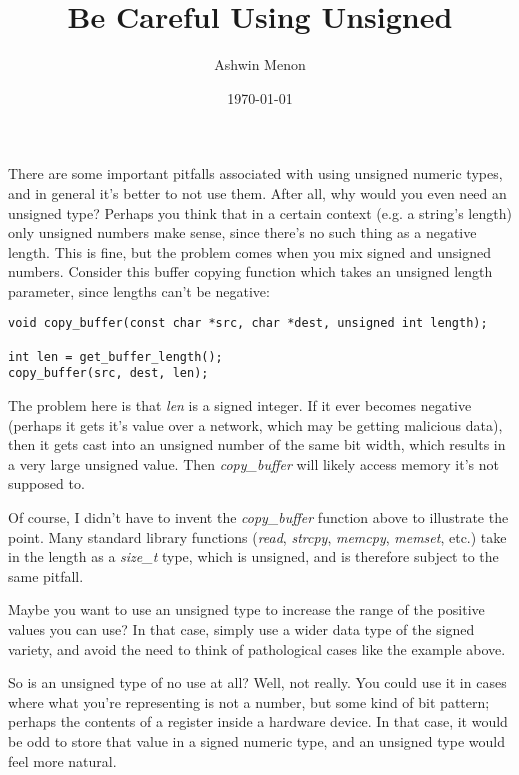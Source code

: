 \documentclass{article}
\begin{document}
\title{Be Careful Using Unsigned}
\author{Ashwin Menon}
\date{\today}
\maketitle

There are some important pitfalls associated with using unsigned numeric types, 
and in general it’s better to not use them. After all, why would you even need an 
unsigned type? Perhaps you think that in a certain context (e.g. a string’s length) 
only unsigned numbers make sense, since there’s no such thing as a negative length. 
This is fine, but the problem comes when you mix signed and unsigned numbers. 
Consider this buffer copying function which takes an unsigned length parameter, 
since lengths can’t be negative:

\begin{lstlisting}
void copy_buffer(const char *src, char *dest, unsigned int length);

int len = get_buffer_length();
copy_buffer(src, dest, len);
\end{lstlisting}

The problem here is that \emph{len} is a signed integer. If it ever becomes 
negative (perhaps it gets it’s value over a network, which may be getting 
malicious data), then it gets cast into an unsigned number of the same bit width, 
which results in a very large unsigned value. Then \emph{copy\_buffer} will likely 
access memory it’s not supposed to.

Of course, I didn’t have to invent the \emph{copy\_buffer} function above to 
illustrate the point. Many standard library functions (\emph{read}, \emph{strcpy}, 
\emph{memcpy}, \emph{memset}, etc.) take in the length as a \emph{size\_t} type, 
which is unsigned, and is therefore subject to the same pitfall.

Maybe you want to use an unsigned type to increase the range of the positive 
values you can use? In that case, simply use a wider data type of the signed 
variety, and avoid the need to think of pathological cases like the example above.

So is an unsigned type of no use at all? Well, not really. You could use it in 
cases where what you’re representing is not a number, but some kind of bit 
pattern; perhaps the contents of a register inside a hardware device. In that 
case, it would be odd to store that value in a signed numeric type, and an 
unsigned type would feel more natural.
\end{document}
